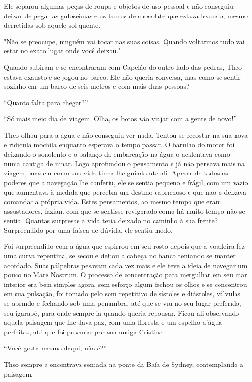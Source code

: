 Ele separou algumas peças de roupa e objetos de uso pessoal e não
conseguiu deixar de pegar as guloseimas e as barras de chocolate que
estava levando, mesmo derretidas sob aquele sol quente.

"Não se preocupe, ninguém vai tocar nas suas coisas. Quando voltarmos
tudo vai estar no exato lugar onde você deixou."

Quando subiram e se encontraram com Capelão do outro lado das pedras,
Theo estava exausto e se jogou no barco. Ele não queria conversa, mas
como se sentir sozinho em um barco de seis metros e com mais duas
pessoas?

``Quanto falta para chegar?''

``Só mais meio dia de viagem. Olha, os botos vão viajar com a gente de
novo!''

Theo olhou para a água e não conseguiu ver nada. Tentou se recostar na
sua nova e ridícula mochila enquanto esperava o tempo passar. O barulho
do motor foi deixando-o sonolento e o balanço da embarcação na água o
acalentava como numa cantiga de ninar. Logo aprofundou o pensamento e já
não pensava mais na viagem, mas em como sua vida tinha lhe guiado até
ali. Apesar de todos os poderes que a navegação lhe conferiu, ele se
sentia pequeno e frágil, com um vazio que aumentava à medida que
percebia um destino caprichoso e que não o deixava comandar a própria
vida. Estes pensamentos, ao mesmo tempo que eram assustadores, faziam
com que se sentisse revigorado como há muito tempo não se sentia.
Quantas surpresas a vida teria deixado no caminho à sua frente?
Surpreendido por uma faísca de dúvida, ele sentiu medo.

Foi surpreendido com a água que espirrou em seu rosto depois que a
voadeira fez uma curva repentina, se secou e deitou a cabeça no banco
tentando se manter acordado. Suas pálpebras pesavam cada vez mais e ele
teve a ideia de navegar um pouco no Mare Nostrum. O processo de
concentração para mergulhar em seu mar interior era bem simples agora,
sem esforço algum fechou os olhos e se concentrou em sua pulsação, foi
tomado pelo som repetitivo de sístoles e diástoles, válvulas se abrindo
e fechando sob uma penumbra, até que se viu no seu lugar preferido, seu
igarapé, para onde sempre ia quando queria repousar. Ficou ali
observando aquela paisagem que lhe dava paz, com uma floresta e um
espelho d'água perfeitos, até que foi procurar por sua amiga Cristine.

``Você gosta mesmo daqui, não é?''

Theo sempre a encontrava sentada na ponte da Baía de Sydney,
contemplando a paisagem.

